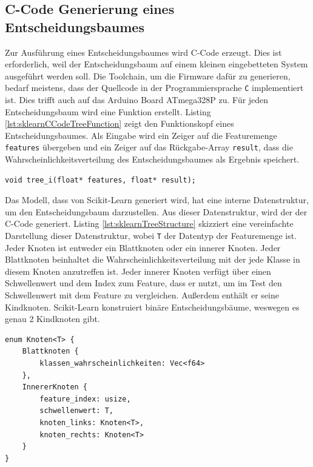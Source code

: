 \subsection{C-Code Generierung eines Entscheidungsbaumes}
\label{sec:cCodeTree}
Zur Ausführung eines Entscheidungsbaumes wird C-Code erzeugt. Dies ist erforderlich, weil der Entscheidungsbaum auf einem kleinen eingebetteten System ausgeführt werden soll. Die Toolchain, um die Firmware
dafür zu generieren, bedarf meistens, dass der Quellcode in der Programmiersprache \texttt{C} implementiert ist. Dies trifft auch auf das Arduino Board ATmega328P zu.
\newline
\newline
Für jeden Entscheidungsbaum wird eine Funktion erstellt. Listing \ref{lst:sklearnCCodeTreeFunction} zeigt den Funktionskopf eines Entscheidungsbaumes. Als Eingabe wird ein Zeiger auf die Featuremenge
\texttt{features} übergeben und ein Zeiger auf das Rückgabe-Array \texttt{result}, dass die Wahrscheinlichkeitsverteilung des Entscheidungsbaumes als Ergebnis speichert.
\begin{lstlisting}[label=lst:sklearnCCodeTreeFunction,caption={C-Code Funktionskopf eines Baumes $i$.}]
void tree_i(float* features, float* result);
\end{lstlisting}
Das Modell, dass von Scikit-Learn generiert wird, hat eine interne Datenstruktur, um den Entscheidungsbaum darzustellen. Aus dieser Datenstruktur, wird der der C-Code generiert. Listing
\ref{lst:sklearnTreeStructure} skizziert eine vereinfachte Darstellung dieser Datenstruktur, wobei \texttt{T} der Datentyp der Featuremenge ist. Jeder Knoten ist entweder ein Blattknoten oder
ein innerer Knoten. Jeder Blattknoten beinhaltet die Wahrscheinlichkeitsverteilung mit der jede Klasse in diesem Knoten anzutreffen ist. Jeder innerer Knoten verfügt über einen Schwellenwert und
dem Index zum Feature, dass er nutzt, um im Test den Schwellenwert mit dem Feature zu vergleichen. Außerdem enthält er seine Kindknoten. Scikit-Learn konstruiert binäre Entscheidungsbäume,
weswegen es genau 2 Kindknoten gibt.
\begin{lstlisting}[label=lst:sklearnTreeStructure,caption={Vereinfachte Skizze der Datenstruktur die von Scikit-Learn für Entscheidungsbäume genutzt wird.}]
enum Knoten<T> {
    Blattknoten {
        klassen_wahrscheinlichkeiten: Vec<f64>
    },
    InnererKnoten {
        feature_index: usize,
        schwellenwert: T,
        knoten_links: Knoten<T>,
        knoten_rechts: Knoten<T>
    }
}
\end{lstlisting}
